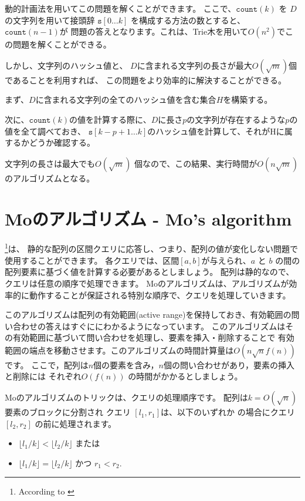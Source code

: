 動的計画法を用いてこの問題を解くことができます。
ここで、$\texttt{count}(k)$ を $D$ の文字列を用いて接頭辞 $\texttt{s}[0 \ldots k]$ を構成する方法の数とすると、
$\texttt{count}(n-1)$が
問題の答えとなります。これは、Trie木を用いて$O(n^2)$でこの問題を解くことができる。

しかし、文字列のハッシュ値と、
$D$に含まれる文字列の長さが最大$O(\sqrt m)$個であることを利用すれば、
この問題をより効率的に解決することができる。

まず、$D$に含まれる文字列の全てのハッシュ値を含む集合$H$を構築する。

次に、$\texttt{count}(k)$の値を計算する際に、$D$に長さ$p$の文字列が存在するような$p$の値を全て調べておき、
$\texttt{s}[k-p+1 \ldots k]$のハッシュ値を計算して、それがHに属するかどうか確認する。

文字列の長さは最大でも$O(\sqrt m)$ 個なので、この結果、実行時間が$O(n \sqrt m)$のアルゴリズムとなる。

\section{Moのアルゴリズム - Mo's algorithm}


\footnote{According to \cite{cod15}}は、
静的な配列の区間クエリに応答し、つまり、配列の値が変化しない問題で使用することができます。
各クエリでは、区間$[a,b]$が与えられ、$a$ と $b$ の間の配列要素に基づく値を計算する必要があるとしましょう。
配列は静的なので、クエリは任意の順序で処理できます。
Moのアルゴリズムは、アルゴリズムが効率的に動作することが保証される特別な順序で、クエリを処理していきます。

このアルゴリズムは配列の有効範囲(active range)を保持しておき、有効範囲の問い合わせの答えはすぐににわかるようになっています。
このアルゴリズムはその有効範囲に基づいて問い合わせを処理し、要素を挿入・削除することで
有効範囲の端点を移動させます。このアルゴリズムの時間計算量は$O(n \sqrt n f(n))$ です。
ここで，配列は$n$個の要素を含み，$n$個の問い合わせがあり，要素の挿入と削除には それぞれ$O(f(n))$ の時間がかかるとしましょう。

Moのアルゴリズムのトリックは、クエリの処理順序です。
配列は$k=O(\sqrt n)$要素のブロックに分割され
クエリ $[l_1,r_1]$は、以下のいずれか の場合にクエリ$[l_2,r_2]$ の前に処理されます。

\begin{itemize}
\item $\lfloor l_1/k \rfloor < \lfloor l_2/k \rfloor$ または
\item $\lfloor l_1/k \rfloor = \lfloor l_2/k \rfloor$ かつ $r_1 < r_2$.
\end{itemize}

